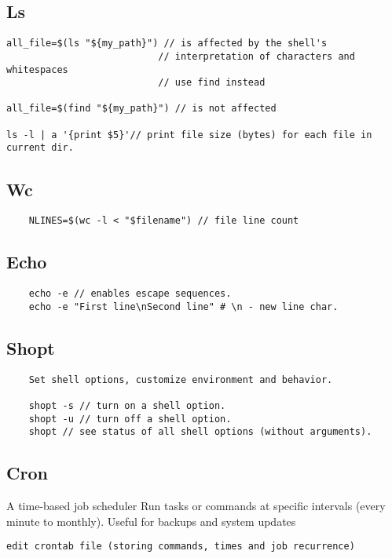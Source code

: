 \subsection{Ls}

\begin{verbatim}
all_file=$(ls "${my_path}") // is affected by the shell's
                           // interpretation of characters and whitespaces
                           // use find instead 

all_file=$(find "${my_path}") // is not affected

ls -l | a '{print $5}'// print file size (bytes) for each file in current dir.
\end{verbatim}

\subsection{Wc}

\begin{verbatim}
    NLINES=$(wc -l < "$filename") // file line count
\end{verbatim}

\subsection{Echo}
\begin{verbatim}
    echo -e // enables escape sequences.
    echo -e "First line\nSecond line" # \n - new line char.
\end{verbatim}

\subsection{Shopt}

\begin{verbatim}
    Set shell options, customize environment and behavior.

    shopt -s // turn on a shell option.
    shopt -u // turn off a shell option.
    shopt // see status of all shell options (without arguments).
\end{verbatim}

\subsection{Cron}

A time-based job scheduler 
Run tasks or commands at specific intervals (every minute to monthly). 
Useful for backups and system updates 
\begin{verbatim}
edit crontab file (storing commands, times and job recurrence)
\end{verbatim}

